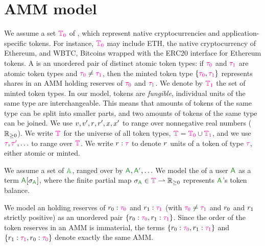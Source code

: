 \chapter{AMM model}




We assume a set  $\TokU[0]$ of ,
which represent native cryptocurrencies and application-specific tokens.
For instance, $\TokU[0]$ may include ETH, the native cryptocurrency
of Ethereum, and WBTC, \ie
Bitcoins wrapped with the ERC20 interface for Ethereum tokens.
A  is an unordered pair of distinct 
atomic token types:
if $\tokT[0]$ and $\tokT[1]$ are atomic token types 
and $\tokT[0] \neq \tokT[1]$,
then the minted token type $\tokM{\tokT[0]}{\tokT[1]}$ 
represents shares in an AMM holding reserves of $\tokT[0]$ and $\tokT[1]$.
We denote by $\TokU[1]$ the set of minted token types.
In our model, tokens are \emph{fungible},
\ie individual units of the same type are interchangeable.
This means that amounts of tokens of the same type
can be split into smaller parts,
and two amounts of tokens of the same type can be joined.
We use $\valV, \valVi, \ammR, \ammRi, x, x'$ to range over
nonnegative real numbers ($\RNN$).
We write $\TokU$ for the universe of all token types, 
\ie $\TokU = \TokU[0] \cup \TokU[1]$,
and we use $\tokT,\tokTi,\ldots$ to range over $\TokU$.
We write \mbox{$\ammR:\tokT$} to denote $\ammR$ units
of a token of type $\tokT$, either atomic or minted. 


We assume a set of  $\PmvU$,
ranged over by $\pmvA, \pmvAi, \ldots$
We model the  of a user $\pmvA$ as a term
$\wal{\pmvA}{\tokBal[\pmvA]}$, where the finite partial map
$\tokBal[\pmvA] \in \TokU \rightharpoonup \RNN$
represents $\pmvA$'s token balance.


We model an  holding reserves of \mbox{$\ammR[0]:\tokT[0]$} and
\mbox{$\ammR[1]:\tokT[1]$} (with $\tokT[0] \neq \tokT[1]$ and $\ammR[0]$ and $\ammR[1]$ strictly positive) 
as an unordered pair \mbox{$\amm{\ammR[0]:\tokT[0]}{\ammR[1]:\tokT[1]}$}.
Since the order of the token reserves in an AMM is immaterial, 
the terms \mbox{$\amm{\ammR[0]:\tokT[0]}{\ammR[1]:\tokT[1]}$}
and \mbox{$\amm{\ammR[1]:\tokT[1]}{\ammR[0]:\tokT[0]}$}
denote exactly the same AMM.

